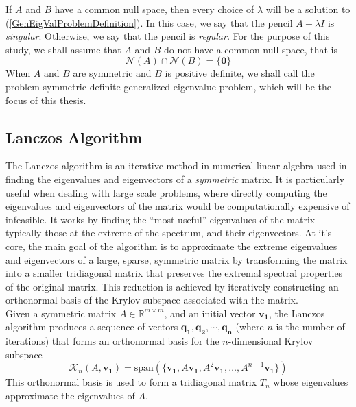 If $A$ and $B$ have a common null space, then every choice of $\lambda$ will be a solution to (\ref{GenEigValProblemDefinition}). In this case, we say that the pencil $A-\lambda I$ is {\em singular}.  Otherwise, we say that the pencil is {\em regular.}   For the purpose of this study, we shall assume that $A$ and $B$ do not have a common null space, that is
\begin{equation}\label{eq:EmptyCommonNullSpace}
	\mathcal{N}(A) \cap \mathcal{N}(B) = \{\mathbf{0} \}
\end{equation}
When $A$ and $B$ are symmetric and $B$ is positive definite, we shall call the problem symmetric-definite generalized eigenvalue problem, which will be the focus of this thesis.

\subsection{Lanczos Algorithm}\label{sec:LanczosAlgorithm}
The Lanczos algorithm is an iterative method in numerical linear algebra used in finding the eigenvalues and eigenvectors of a \textit{symmetric} matrix. It is particularly useful when dealing with large scale problems, where directly computing the eigenvalues and eigenvectors of the matrix would be computationally expensive of infeasible. It works by finding the ``most useful'' eigenvalues of the matrix \textemdash\, typically those at the extreme of the spectrum, and their eigenvectors. At it's core, the main goal of the algorithm is to approximate the extreme eigenvalues and eigenvectors of a large, sparse, symmetric matrix by transforming the matrix into a smaller tridiagonal matrix that preserves the extremal spectral properties of the original matrix. This reduction is achieved by iteratively constructing an orthonormal basis of the Krylov subspace associated with the matrix.\\
Given a symmetric matrix $A \in \mathbb{R}^{m\times m}$, and an initial vector $\mathbf{v_1}$, the Lanczos algorithm produces a sequence of vectors $\mathbf{q_1}, \mathbf{q_2}, \cdots, \mathbf{q_n}$ (where $n$ is the number of iterations) that forms an orthonormal basis for the $n$-dimensional Krylov subspace
\begin{equation}\label{eq:KrylovSubspaceDefinition}
	\mathcal{K}_n(A, \mathbf{v_1}) = \text{span}(\{\mathbf{v_1}, A\mathbf{v_1}, A^2\mathbf{v_1}, \ldots, A^{n-1}\mathbf{v_1}\})
\end{equation}
This orthonormal basis is used to form a tridiagonal matrix $T_n$ whose eigenvalues approximate the eigenvalues of $A$.
